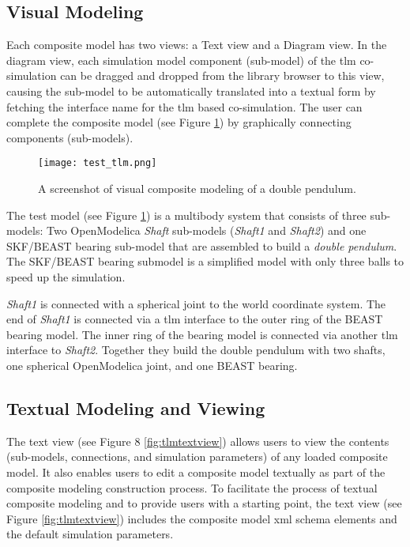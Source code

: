 \subsection{Visual Modeling}
\label{sec:tlmvisual}

Each composite model has two views: a Text view and a Diagram view. In the diagram view, each simulation
model component (sub-model) of the \acrshort{tlm} co-simulation can be dragged and dropped from the library browser to this view, causing the sub-model to be automatically translated into a textual form by fetching the interface name for the \acrshort{tlm} based co-simulation. The user can complete the composite model (see Figure \ref{fig:tlmtest}) by graphically connecting components (sub-models).

\begin{landscape}
\begin{figure}
	\texttt{[image: test\_tlm.png]}
	\caption{A screenshot of visual composite modeling of a double pendulum.}
	\label{fig:tlmtest}
\end{figure}
\end{landscape}

The test model (see Figure \ref{fig:tlmtest}) is a multibody system that consists of three sub-models: Two OpenModelica
\textit{Shaft} sub-models (\textit{Shaft1} and \textit{Shaft2}) and one SKF/BEAST bearing sub-model that are assembled to build a \textit{double pendulum}. The SKF/BEAST bearing submodel is a simplified model with only three balls to speed up the simulation. 

\textit{Shaft1} is connected with a spherical joint to the world coordinate system. The end of \textit{Shaft1} is connected via a \acrshort{tlm} interface to the outer ring of the BEAST bearing model. The inner ring of the bearing model is connected via another \acrshort{tlm} interface to \textit{Shaft2}. Together they build the double pendulum with two shafts, one spherical OpenModelica joint, and one BEAST bearing. 

\subsection{Textual Modeling and Viewing}
\label{sec:tlmtextual}

The text view (see Figure 8 \ref{fig:tlmtextview}) allows users to view the contents (sub-models, connections, and simulation
parameters) of any loaded composite model. It also enables users to edit a composite model textually as
part of the composite modeling construction process. To facilitate the process of textual composite modeling
and to provide users with a starting point, the text view (see Figure \ref{fig:tlmtextview}) includes the composite model \acrshort{xml}
schema elements and the default simulation parameters. 

